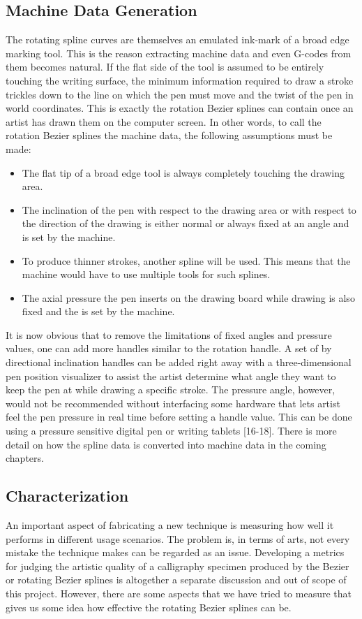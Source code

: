 \subsection{Machine Data Generation}
The rotating spline curves are themselves an emulated ink-mark of a broad edge marking tool. This is the reason extracting machine data and even G-codes from them becomes natural. If the flat side of the tool is assumed to be entirely touching the writing surface, the minimum information required to draw a stroke trickles down to the line on which the pen must move and the twist of the pen in world coordinates. This is exactly the rotation Bezier splines can contain once an artist has drawn them on the computer screen. In other words, to call the rotation Bezier splines the machine data, the following assumptions must be made:
\begin{itemize}
	\item The flat tip of a broad edge tool is always completely touching the drawing area.
	\item The inclination of the pen with respect to the drawing area or with respect to the direction of the drawing is either normal or always fixed at an angle and is set by the machine.
	\item To produce thinner strokes, another spline will be used. This means that the machine would have to use multiple tools for such splines.
	\item The axial pressure the pen inserts on the drawing board while drawing is also fixed and the is set by the machine.
\end{itemize}

It is now obvious that to remove the limitations of fixed angles and pressure values, one can add more handles similar to the rotation handle. A set of by directional inclination handles can be added right away with a three-dimensional pen position visualizer to assist the artist determine what angle they want to keep the pen at while drawing a specific stroke. The pressure angle, however, would not be recommended without interfacing some hardware that lets artist feel the pen pressure in real time before setting a handle value. This can be done using a pressure sensitive digital pen or writing tablets [16-18].
There is more detail on how the spline data is converted into machine data in the coming chapters.

\subsection{Characterization}
An important aspect of fabricating a new technique is measuring how well it performs in different usage scenarios. The problem is, in terms of arts, not every mistake the technique makes can be regarded as an issue. Developing a metrics for judging the artistic quality of a calligraphy specimen produced by the Bezier or rotating Bezier splines is altogether a separate discussion and out of scope of this project. However, there are some aspects that we have tried to measure that gives us some idea how effective the rotating Bezier splines can be.


